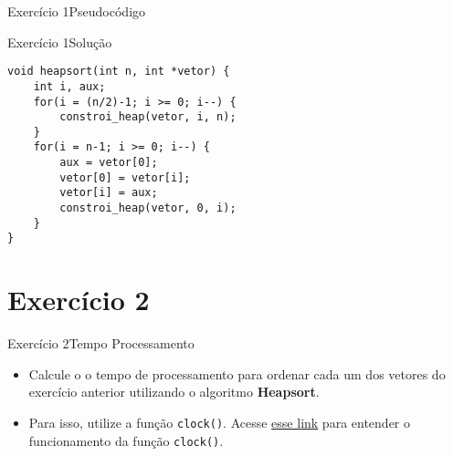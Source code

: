 \documentclass[aspectratio=169]{beamer}
\begin{document}
\begin{frame}[fragile]{Exercício 1}{Pseudocódigo}
\end{frame}


\begin{frame}[fragile]{Exercício 1}{Solução}
\begin{lstlisting}[style=CStyle]
void heapsort(int n, int *vetor) {
    int i, aux;
    for(i = (n/2)-1; i >= 0; i--) {
        constroi_heap(vetor, i, n);
    }
    for(i = n-1; i >= 0; i--) {
        aux = vetor[0];
        vetor[0] = vetor[i];
        vetor[i] = aux;
        constroi_heap(vetor, 0, i);
    }
}
\end{lstlisting}  
\end{frame}

\section{Exercício 2}

\begin{frame}[fragile]{Exercício 2}{Tempo Processamento}
\begin{itemize}
\item Calcule o o tempo de processamento para ordenar cada um dos vetores do exercício anterior utilizando o algoritmo {\bf Heapsort}. 
\item Para isso, utilize a função \verb|clock()|. Acesse \href{http://wurthmann.blogspot.com/2015/04/medir-tempo-de-execucao-em-c.html}{\color{blue} esse link} para entender o funcionamento da função \verb|clock()|.
\end{itemize}
\end{frame}
\end{document}
